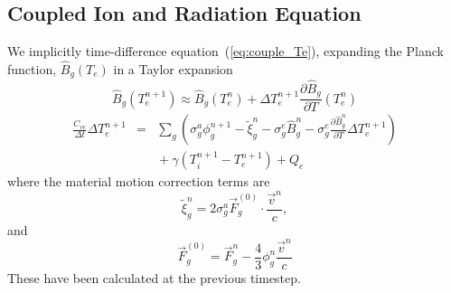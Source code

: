 \documentclass{article}
\newcommand{\partl}[2]{\ensuremath{\frac{\partial{#1}}{\partial{#2}}}}\newcommand{\del}{\ensuremath{\vec{\nabla}}}
\newcommand{\dt}{\ensuremath{\Delta t}}
\newcommand{\cveOdt}{\ensuremath{\frac{C_{ve}}{\dt}}}
\newcommand{\Bg}{\ensuremath{\hat{B}_{g}}}
\newcommand{\Bgn}{\ensuremath{\hat{B}_{g}^{n}}}
\newcommand{\pBgndT}{\ensuremath{\frac{\partial\Bgn}{\partial T}}}
\begin{document}
\subsection{Coupled Ion and Radiation Equation}

We implicitly time-difference equation~(\ref{eq:couple_Te}),
expanding the Planck function,
$\Bg(T_{e})$ in a Taylor expansion
\begin{equation}
        \Bg(T_{e}^{n+1}) \approx \Bg(T_{e}^{n})
                 + \Delta T_{e}^{n+1} \partl{\Bg}{T}(T_{e}^{n})
\end{equation}
\begin{eqnarray}
        \cveOdt \Delta T_{e}^{n+1} &=&
                \sum_{g} \left(
                        \sigma_{g}^{a} \phi_{g}^{n+1} - \tilde{\xi}_{g}^{n}
                        - \sigma_{g}^{e} \Bgn
                        - \sigma_{g}^{e} \pBgndT \Delta T_{e}^{n+1} 
                        \right) \nonumber \\
                & & \mbox{} + \gamma (T_{i}^{n+1} - T_{e}^{n+1}) + Q_{e}
\label{eq:Te}
\end{eqnarray}
where the material motion correction terms are
\begin{equation}
        \tilde{\xi}_{g}^{n} = 2 \sigma_{g}^{a} \vec{F}_{g}^{(0)} \cdot
                                \frac{\vec{v}^{n}}{c}, 
\label{eq:tilde_xi}
\end{equation}
and
\begin{equation}
        \vec{F}_{g}^{(0)} = \vec{F}_{g}^{n} - \frac{4}{3} \phi_{g}^{n}
                                                \frac{\vec{v}^{n}}{c}
\end{equation}
These have been calculated at the previous timestep.
\end{document}
